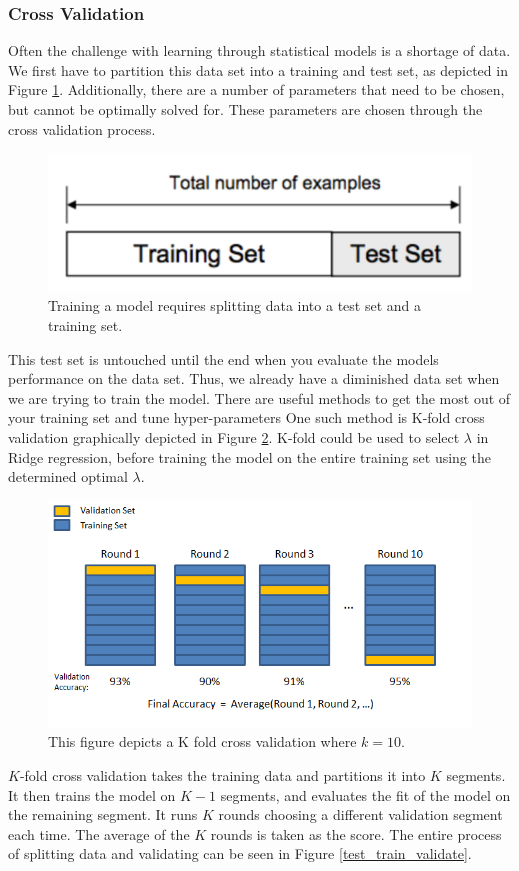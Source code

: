 \documentclass[12pt]{article}
\begin{document}
\subsubsection{Cross Validation}
Often the challenge with learning through statistical models is a shortage of data. We first have to partition this data set into a training and test set, as depicted in Figure \ref{test_train}. Additionally, there are a number of parameters that need to be chosen, but cannot be optimally solved for. These parameters are chosen through the cross validation process.

\begin{figure}[ht]
	\centering
	\includegraphics[width=.5\textwidth]{test_train.png}
	\caption{Training a model requires splitting data into a test set and a training set. \cite{kfold}}
	\label{test_train}
\end{figure}

This test set is untouched until the end when you evaluate the models performance on the data set. Thus, we already have a diminished data set when we are trying to train the model. There are useful methods to get the most out of your training set and tune hyper-parameters One such method is K-fold cross validation graphically depicted in Figure \ref{kfold}. K-fold could be used to select $\lambda$ in Ridge regression, before training the model on the entire training set using the determined optimal $\lambda$.

\begin{figure}[ht]
	\centering
	\includegraphics[width=.5\textwidth]{kfold.png}
	\caption{This figure depicts a K fold cross validation where $k=10$. \cite{kfold}}
	\label{kfold}
\end{figure}

$K$-fold cross validation takes the training data and partitions it into $K$ segments. It then trains the model on $K-1$ segments, and evaluates the fit of the model on the remaining segment. It runs $K$ rounds choosing a different validation segment each time. The average of the $K$ rounds is taken as the score. The entire process of splitting data and validating can be seen in Figure \ref{test_train_validate}.
\end{document}
